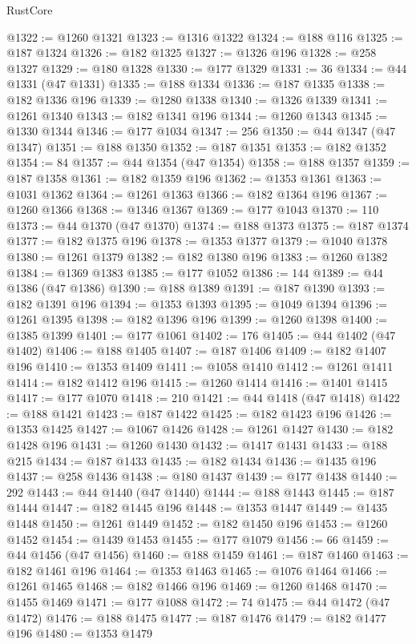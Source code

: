 \begin{lexlean}{RustCore}
\begin{coremodule}
@1322 := @1260 @1321
@1323 := @1316 @1322
@1324 := @188 @116
@1325 := @187 @1324
@1326 := @182 @1325
@1327 := @1326 @196
@1328 := @258 @1327
@1329 := @180 @1328
@1330 := @177 @1329
@1331 := 36
@1334 := @44 @1331 (@47 @1331)
@1335 := @188 @1334
@1336 := @187 @1335
@1338 := @182 @1336 @196
@1339 := @1280 @1338
@1340 := @1326 @1339
@1341 := @1261 @1340
@1343 := @182 @1341 @196
@1344 := @1260 @1343
@1345 := @1330 @1344
@1346 := @177 @1034
@1347 := 256
@1350 := @44 @1347 (@47 @1347)
@1351 := @188 @1350
@1352 := @187 @1351
@1353 := @182 @1352
@1354 := 84
@1357 := @44 @1354 (@47 @1354)
@1358 := @188 @1357
@1359 := @187 @1358
@1361 := @182 @1359 @196
@1362 := @1353 @1361
@1363 := @1031 @1362
@1364 := @1261 @1363
@1366 := @182 @1364 @196
@1367 := @1260 @1366
@1368 := @1346 @1367
@1369 := @177 @1043
@1370 := 110
@1373 := @44 @1370 (@47 @1370)
@1374 := @188 @1373
@1375 := @187 @1374
@1377 := @182 @1375 @196
@1378 := @1353 @1377
@1379 := @1040 @1378
@1380 := @1261 @1379
@1382 := @182 @1380 @196
@1383 := @1260 @1382
@1384 := @1369 @1383
@1385 := @177 @1052
@1386 := 144
@1389 := @44 @1386 (@47 @1386)
@1390 := @188 @1389
@1391 := @187 @1390
@1393 := @182 @1391 @196
@1394 := @1353 @1393
@1395 := @1049 @1394
@1396 := @1261 @1395
@1398 := @182 @1396 @196
@1399 := @1260 @1398
@1400 := @1385 @1399
@1401 := @177 @1061
@1402 := 176
@1405 := @44 @1402 (@47 @1402)
@1406 := @188 @1405
@1407 := @187 @1406
@1409 := @182 @1407 @196
@1410 := @1353 @1409
@1411 := @1058 @1410
@1412 := @1261 @1411
@1414 := @182 @1412 @196
@1415 := @1260 @1414
@1416 := @1401 @1415
@1417 := @177 @1070
@1418 := 210
@1421 := @44 @1418 (@47 @1418)
@1422 := @188 @1421
@1423 := @187 @1422
@1425 := @182 @1423 @196
@1426 := @1353 @1425
@1427 := @1067 @1426
@1428 := @1261 @1427
@1430 := @182 @1428 @196
@1431 := @1260 @1430
@1432 := @1417 @1431
@1433 := @188 @215
@1434 := @187 @1433
@1435 := @182 @1434
@1436 := @1435 @196
@1437 := @258 @1436
@1438 := @180 @1437
@1439 := @177 @1438
@1440 := 292
@1443 := @44 @1440 (@47 @1440)
@1444 := @188 @1443
@1445 := @187 @1444
@1447 := @182 @1445 @196
@1448 := @1353 @1447
@1449 := @1435 @1448
@1450 := @1261 @1449
@1452 := @182 @1450 @196
@1453 := @1260 @1452
@1454 := @1439 @1453
@1455 := @177 @1079
@1456 := 66
@1459 := @44 @1456 (@47 @1456)
@1460 := @188 @1459
@1461 := @187 @1460
@1463 := @182 @1461 @196
@1464 := @1353 @1463
@1465 := @1076 @1464
@1466 := @1261 @1465
@1468 := @182 @1466 @196
@1469 := @1260 @1468
@1470 := @1455 @1469
@1471 := @177 @1088
@1472 := 74
@1475 := @44 @1472 (@47 @1472)
@1476 := @188 @1475
@1477 := @187 @1476
@1479 := @182 @1477 @196
@1480 := @1353 @1479

\end{coremodule}
\end{lexlean}
